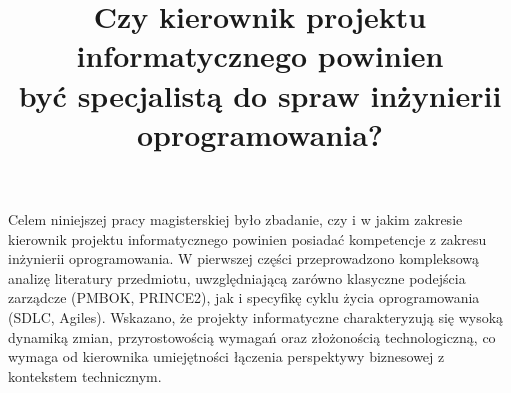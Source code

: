 \documentclass[
    left=2.5cm,         %
    right=2.5cm,        %
    top=2.5cm,          %
    bottom=3cm,         %
    bindingoffset=6mm,  %
    nohyphenation=false %
]{eiti/eiti-thesis}
\begin{document}
\title{
Czy kierownik projektu informatycznego powinien \\być specjalistą do spraw inżynierii oprogramowania?
}



\cleardoublepage %
\tableofcontents

\cleardoublepage %
\pagestyle{headings}
\renewcommand*{\bibfont}{\fontsize{10pt}{12pt}\selectfont}




\cleardoublepage %
\printbibliography

\newpage
\pagestyle{plain}

\vspace{0.8cm}

\listoffigurestoc     %
\vspace{1cm}          %
\listoftablestoc      %
\vspace{1cm}          %
\listofappendicestoc  %

\newpage %
\streszczenie

Celem niniejszej pracy magisterskiej było zbadanie, czy i w jakim zakresie kierownik projektu informatycznego powinien posiadać kompetencje z zakresu inżynierii oprogramowania. W pierwszej części przeprowadzono kompleksową analizę literatury przedmiotu, uwzględniającą zarówno klasyczne podejścia zarządcze (PMBOK, PRINCE2), jak i specyfikę cyklu życia oprogramowania (SDLC, Agiles). Wskazano, że projekty informatyczne charakteryzują się wysoką dynamiką zmian, przyrostowością wymagań oraz złożonością technologiczną, co wymaga od kierownika umiejętności łączenia perspektywy biznesowej z kontekstem technicznym.
\end{document}
